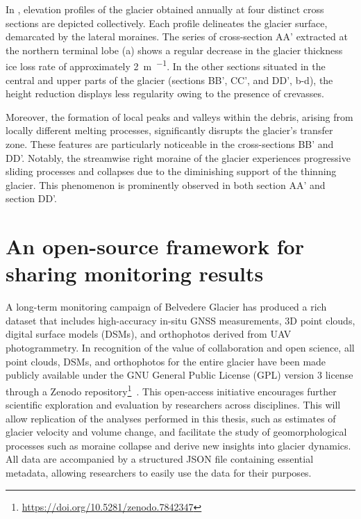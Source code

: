 In , elevation profiles of the glacier obtained annually at four distinct cross sections are depicted collectively. 
Each profile delineates the glacier surface, demarcated by the lateral moraines. 
The series of cross-section AA' extracted at the northern terminal lobe (a) shows a regular decrease in the glacier thickness
ice loss rate of approximately \qty{2}{\meter\per\year}.
In the other sections situated in the central and upper parts of the glacier (sections BB', CC', and DD', b-d), 
the height reduction displays less regularity owing to the presence of crevasses.

Moreover, the formation of local peaks and valleys within the debris, arising from locally different melting processes, significantly disrupts the glacier's transfer zone. 
These features are particularly noticeable in the cross-sections BB' and DD'.
Notably, the streamwise right moraine of the glacier experiences progressive sliding processes and collapses due to the diminishing support of the thinning glacier. 
This phenomenon is prominently observed in both section AA' and section DD'.

\section{An open-source framework for sharing monitoring results}\label{sec:3:open-data}

A long-term monitoring campaign of Belvedere Glacier has produced a rich dataset that includes high-accuracy in-situ GNSS measurements, 3D point clouds, digital surface models (DSMs), and orthophotos derived from UAV photogrammetry.
In recognition of the value of collaboration and open science, all point clouds, DSMs, and orthophotos for the entire glacier have been made publicly available under the GNU General Public License (GPL) version 3 license through a Zenodo repository\footnote{\url{https://doi.org/10.5281/zenodo.7842347}}~\citep{ioli_2023_zenodo}.
This open-access initiative encourages further scientific exploration and evaluation by researchers across disciplines.
This will allow replication of the analyses performed in this thesis, such as estimates of glacier velocity and volume change, and facilitate the study of geomorphological processes such as moraine collapse and derive new insights into glacier dynamics. 
All data are accompanied by a structured JSON file containing essential metadata, allowing researchers to easily use the data for their purposes.

